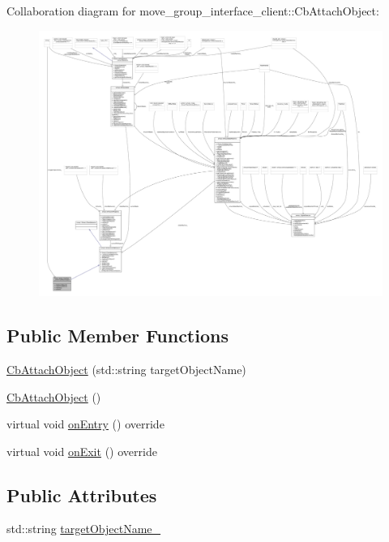 Collaboration diagram for move\+\_\+group\+\_\+interface\+\_\+client\+:\+:Cb\+Attach\+Object\+:
\nopagebreak
\begin{figure}[H]
\begin{center}
\leavevmode
\includegraphics[width=350pt]{classmove__group__interface__client_1_1CbAttachObject__coll__graph}
\end{center}
\end{figure}
\subsection*{Public Member Functions}
\begin{DoxyCompactItemize}
\item 
\hyperlink{classmove__group__interface__client_1_1CbAttachObject_a988cee451be9199ed6a7e49446635221}{Cb\+Attach\+Object} (std\+::string target\+Object\+Name)
\item 
\hyperlink{classmove__group__interface__client_1_1CbAttachObject_aadb8c5d4e0dfbefc054276da7ecfcbc3}{Cb\+Attach\+Object} ()
\item 
virtual void \hyperlink{classmove__group__interface__client_1_1CbAttachObject_a85ddd1ee5d0057fe489de10007982f22}{on\+Entry} () override
\item 
virtual void \hyperlink{classmove__group__interface__client_1_1CbAttachObject_a99efdfdd854a2a9633c92b33a78fcd34}{on\+Exit} () override
\end{DoxyCompactItemize}
\subsection*{Public Attributes}
\begin{DoxyCompactItemize}
\item 
std\+::string \hyperlink{classmove__group__interface__client_1_1CbAttachObject_a3d2591373f673a8479025044138bd82b}{target\+Object\+Name\+\_\+}
\end{DoxyCompactItemize}



